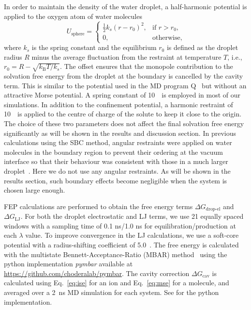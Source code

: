 In order to maintain the density of the water droplet, a half-harmonic potential is applied to the 
oxygen atom of water molecules
\begin{equation}
U_{\text{sphere}} = 
\begin{cases}
\frac{1}{2} k_{s} (r-r_{0})^2,& \text{if } r>r_{0}, \\
0, & \text{otherwise},
\end{cases}
\label{eq:drop_pot}
\end{equation}
where $k_{s}$ is the spring constant and the equilibrium $r_{0}$ is defined as the droplet radius $R$ 
minus the average fluctuation from the restraint at temperature $T$, i.e., 
$r_{0}=R-\sqrt{k_{\text{B}} T/k_{s}}$. The offset ensures that the monopole contribution to the solvation 
free energy from the droplet at the boundary is cancelled by the cavity term.  This is similar to the 
potential used in the MD program Q~\cite{Marelius1999} but without an attractive Morse potential. A 
spring constant of 10~\spring\ is employed in most of our simulations. In addition to the confinement 
potential, a harmonic restraint of 10~\spring\ is applied to the centre of charge of the solute to keep 
it close to the origin. The choice of these two parameters does not affect the final solvation free 
energy significantly as will be shown in the results and discussion section. In previous calculations 
using the SBC method, angular restraints were applied on water molecules in the boundary region to 
prevent their ordering at the vacuum interface so that their behaviour was consistent with those in 
a much larger droplet~\cite{Aqvist1990,Beglov1994}. Here we do not use any angular restraints. As will 
be shown in the results section, such boundary effects become negligible when the system is chosen 
large enough.

FEP calculations are performed to obtain the free energy terms $\Delta G_{\text{drop-el}}$ and 
$\Delta G_{\text{LJ}}$. For both the droplet electrostatic and LJ terms, we use 21 equally spaced 
windows with a sampling time of 0.1 ns/1.0 ns for equilibration/production at each $\lambda$ value. 
To improve convergence in the LJ calculations, we use a soft-core potential with a radius-shifting 
coefficient of 5.0~\angs. The free energy is calculated with the multistate Bennett-Acceptance-Ratio 
(MBAR) method~\cite{Shirts2008} using the python implementation {\it pymbar} available at 
\url{https://github.com/choderalab/pymbar}. The cavity correction $\Delta G_{\text{cav}}$ is 
calculated using Eq.~\eqref{eq:ise} for an ion and Eq.~\eqref{eq:mse} for a molecule, and averaged 
over a 2~ns MD simulation for each system. See  for the python implementation.

